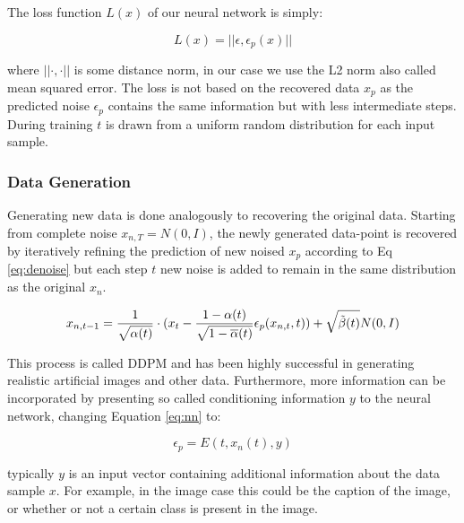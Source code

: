 The loss function $L(x)$ of our neural network is simply:

\begin{equation}
    L(x) = ||\epsilon,\epsilon_p(x)||
\end{equation}

where $||\cdot,\cdot||$ is some distance norm, in our case we use the L2 norm also called mean squared error. The loss is not based on the recovered data $x_p$ as the predicted noise $\epsilon_p$ contains the same information but with less intermediate steps.
During training $t$ is drawn from a uniform random distribution for each input sample.

\subsubsection{Data Generation}
Generating new data is done analogously to recovering the original data. Starting from complete noise $x_{n,T} = N(0,I)$, the newly generated data-point is recovered by iteratively refining the prediction of new noised $x_p$ according to Eq \ref{eq:denoise} but each step $t$ new noise is added to remain in the same distribution as the original $x_n$. 




\begin{equation}
    x_{n,t-1} = \frac{1}{\sqrt{\alpha(t)}} \cdot (x_{t} - \frac{1-\alpha(t)}{\sqrt{1-\overline{\alpha}(t)}} \epsilon_p(x_{n,t},t)) + \sqrt{\Tilde{\beta}(t)}  N(0,I) %
    \label{eq:generation}
\end{equation}

This process is called DDPM \citep{ddpm} and has been highly successful in generating realistic artificial images and other data. 
\bigbreak
Furthermore, more information can be incorporated by presenting so called conditioning information $y$ to the neural network, changing Equation \ref{eq:nn} to:

\begin{equation}
    \epsilon_{p} = E(t,x_n(t),y)
\end{equation}

typically $y$ is an input vector containing additional information about the data sample $x$. For example, in the image case this could be the caption of the image, or whether or not a certain class is present in the image.

